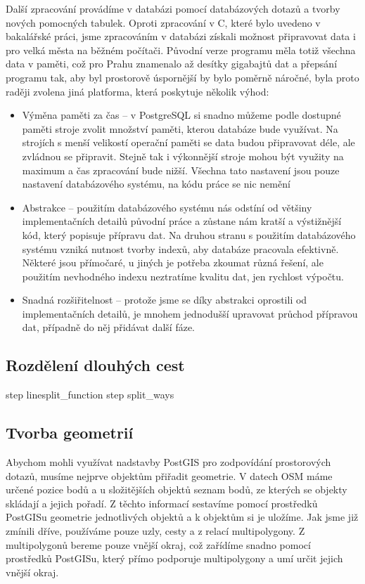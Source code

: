 Další zpracování provádíme v databázi pomocí databázových dotazů a tvorby nových
pomocných tabulek. Oproti zpracování v C, které bylo uvedeno v bakalářské práci,
jsme zpracováním v databázi získali možnost připravovat data i pro velká města
na běžném počítači. Původní verze programu měla totiž všechna data v paměti, což
pro Prahu znamenalo až desítky gigabajtů dat a přepsání programu tak, aby byl
prostorově úspornější by bylo poměrně náročné, byla proto raději zvolena jiná
platforma, která poskytuje několik výhod:
\begin{itemize}
	\item Výměna paměti za čas -- v PostgreSQL si snadno můžeme podle
	dostupné paměti stroje zvolit množství paměti, kterou databáze bude
	využívat. Na strojích s menší velikostí operační paměti se data budou
	připravovat déle, ale zvládnou se připravit. Stejně tak i výkonnější
	stroje mohou být využity na maximum a čas zpracování bude nižší. Všechna
	tato nastavení jsou pouze nastavení databázového systému, na kódu práce
	se nic nemění
	\item Abstrakce -- použitím databázového systému nás odstíní od většiny
	implementačních detailů původní práce a zůstane nám kratší a výstižnější
	kód, který popisuje přípravu dat. Na druhou stranu s použitím
	databázového systému vzniká nutnost tvorby indexů, aby databáze
	pracovala efektivně. Některé jsou přímočaré, u jiných je potřeba zkoumat
	různá řešení, ale použitím nevhodného indexu neztratíme kvalitu dat, jen
	rychlost výpočtu. 
	\item Snadná rozšiřitelnost -- protože jsme se díky abstrakci oprostili
	od implementačních detailů, je mnohem jednodušší upravovat průchod
	přípravou dat, případně do něj přidávat další fáze.
\end{itemize}

\subsection{Rozdělení dlouhých cest}
\TODO step linesplit\_function
\TODO step split\_ways 

\subsection{Tvorba geometrií}
Abychom mohli využívat nadstavby PostGIS pro zodpovídání prostorových dotazů,
musíme nejprve objektům přiřadit geometrie. V datech OSM máme určené pozice bodů
a u složitějších objektů seznam bodů, ze kterých se objekty skládají a jejich
pořadí. Z těchto informací sestavíme pomocí prostředků PostGISu geometrie
jednotlivých objektů a k objektům si je uložíme. Jak jsme již zmínili dříve,
používáme pouze uzly, cesty a z relací multipolygony. Z multipolygonů bereme
pouze vnější okraj, což zařídíme snadno pomocí prostředků PostGISu, který přímo
podporuje multipolygony a umí určit jejich vnější okraj.
 
